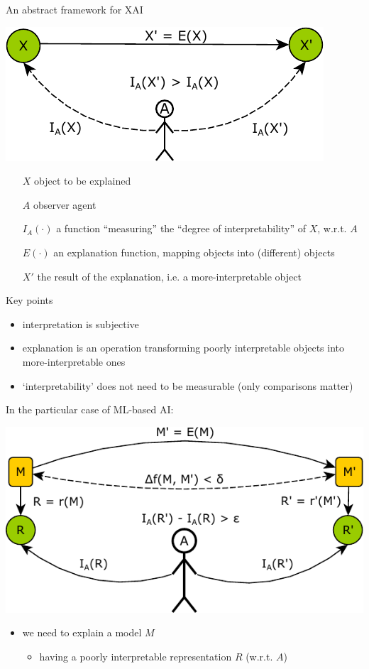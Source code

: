\documentclass[presentation]{beamer}\mode<presentation>{\usetheme{AMSBolognaFC}}
\begin{document}
\begin{frame}[allowframebreaks]{An abstract framework for XAI}

    \begin{center}
        \includegraphics[width=.5\linewidth]{figures/framework.pdf}
    \end{center}
    \begin{itemize}
        \item[$X$] object to be explained
        \item[$A$] observer agent
        \item[$I_A(\cdot)$] a function ``measuring'' the ``degree of interpretability'' of $X$, w.r.t. $A$
        \item[$E(\cdot)$] an \alert{explanation} function, mapping objects into (different) objects      
        \item[$X'$] the \alert{result} of the explanation, i.e. a \alert{more-interpretable} object
    \end{itemize}
    
    \begin{block}{Key points}
        \begin{itemize}
            \item interpretation is \alert{subjective}
            \item explanation is an operation transforming poorly interpretable objects into more-interpretable ones
            \item `interpretability' does not need to be measurable (only comparisons matter)
        \end{itemize}
    \end{block}

    \framebreak

    In the particular case of ML-based AI:
    \begin{center}
        \includegraphics[width=.5\linewidth]{figures/global.pdf}
    \end{center}
    \begin{itemize}
        \item we need to explain a model $M$
        \begin{itemize}
            \item having a poorly interpretable \alert{representation} $R$ (w.r.t. $A$)
        \end{itemize}


\end{itemize}
\end{frame}
\end{document}
